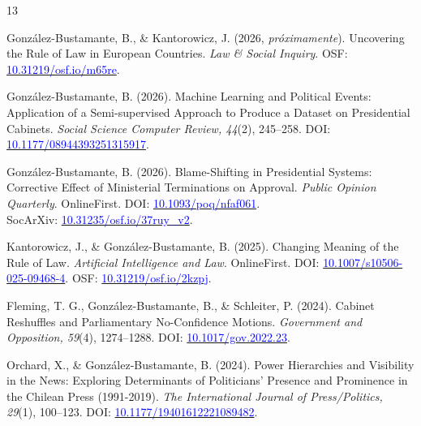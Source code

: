 \begin{publications}

\begin{benumerate}{13}

\item{González-Bustamante, B., \& Kantorowicz, J. (2026, {\itshape próximamente}). Uncovering the Rule of Law in European Countries. {\itshape Law \& Social Inquiry}. OSF: \href{https://doi.org/10.31219/osf.io/m65re}{\textcolor{blue}{10.31219/osf.io/m65re}}.}\vspace{1mm}

\item{González-Bustamante, B. (2026). Machine Learning and Political Events: Application of a Semi-supervised Approach to Produce a Dataset on Presidential Cabinets. {\itshape Social Science Computer Review, 44}(2), 245--258. DOI: \href{https://doi.org/10.1177/08944393251315917}{\textcolor{blue}{10.1177/08944393251315917}}.}\vspace{1mm} 

\item{González-Bustamante, B. (2026). Blame-Shifting in Presidential Systems: Corrective Effect of Ministerial Terminations on Approval. {\itshape Public Opinion Quarterly}. OnlineFirst. DOI: \href{https://doi.org/10.1093/poq/nfaf061}{\textcolor{blue}{10.1093/poq/nfaf061}}. \\ SocArXiv: \href{https://doi.org/10.31235/osf.io/37ruy_v2}{\textcolor{blue}{10.31235/osf.io/37ruy\_v2}}.}\vspace{1mm}

\item{Kantorowicz, J., \& González-Bustamante, B. (2025). Changing Meaning of the Rule of Law. {\itshape Artificial Intelligence and Law}. OnlineFirst. DOI: \href{https://doi.org/10.1007/s10506-025-09468-4}{\textcolor{blue}{10.1007/s10506-025-09468-4}}. OSF: \href{https://doi.org/10.31219/osf.io/2kzpj}{\textcolor{blue}{10.31219/osf.io/2kzpj}}.}\vspace{1mm}

\item{Fleming, T. G., González-Bustamante, B., \& Schleiter, P. (2024). Cabinet Reshuffles and Parliamentary No-Confidence Motions. {\itshape Government and Opposition, 59}(4), 1274--1288. DOI: \href{https://doi.org/10.1017/gov.2022.23}{\textcolor{blue}{10.1017/gov.2022.23}}.}\vspace{1mm}

\item{Orchard, X., \& González-Bustamante, B. (2024). Power Hierarchies and Visibility in the News: Exploring Determinants of Politicians’ Presence and Prominence in the Chilean Press (1991-2019). {\itshape The International Journal of Press/Politics, 29}(1), 100--123. DOI: \href{https://doi.org/10.1177/19401612221089482}{\textcolor{blue}{10.1177/19401612221089482}}.}\vspace{1mm}


\end{benumerate}
\end{publications}
